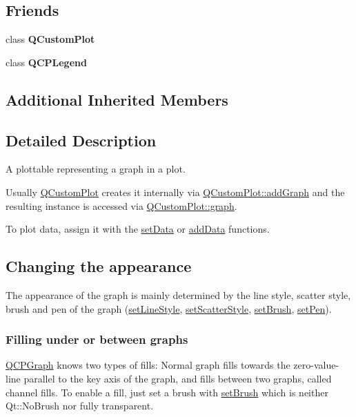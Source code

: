 \subsection*{Friends}
\begin{DoxyCompactItemize}
\item 
\hypertarget{classQCPGraph_a1cdf9df76adcfae45261690aa0ca2198}{class {\bfseries Q\-Custom\-Plot}}\label{classQCPGraph_a1cdf9df76adcfae45261690aa0ca2198}

\item 
\hypertarget{classQCPGraph_a8429035e7adfbd7f05805a6530ad5e3b}{class {\bfseries Q\-C\-P\-Legend}}\label{classQCPGraph_a8429035e7adfbd7f05805a6530ad5e3b}

\end{DoxyCompactItemize}
\subsection*{Additional Inherited Members}


\subsection{Detailed Description}
A plottable representing a graph in a plot. 

Usually \hyperlink{classQCustomPlot}{Q\-Custom\-Plot} creates it internally via \hyperlink{classQCustomPlot_a6fb2873d35a8a8089842d81a70a54167}{Q\-Custom\-Plot\-::add\-Graph} and the resulting instance is accessed via \hyperlink{classQCustomPlot_a6d3ed93c2bf46ab7fa670d66be4cddaf}{Q\-Custom\-Plot\-::graph}.

To plot data, assign it with the \hyperlink{classQCPGraph_a1df2fd710545c8ba3b2c99a39a27bf8b}{set\-Data} or \hyperlink{classQCPGraph_aa5c6181d84db72ce4dbe9dc15a34ef4f}{add\-Data} functions.\hypertarget{classQCPStatisticalBox_appearance}{}\subsection{Changing the appearance}\label{classQCPStatisticalBox_appearance}
The appearance of the graph is mainly determined by the line style, scatter style, brush and pen of the graph (\hyperlink{classQCPGraph_a513fecccff5b2a50ce53f665338c60ff}{set\-Line\-Style}, \hyperlink{classQCPGraph_a06373e09547bcfe237dd8ebcbe5c255a}{set\-Scatter\-Style}, \hyperlink{classQCPAbstractPlottable_a7a4b92144dca6453a1f0f210e27edc74}{set\-Brush}, \hyperlink{classQCPAbstractPlottable_ab74b09ae4c0e7e13142fe4b5bf46cac7}{set\-Pen}).\hypertarget{classQCPGraph_filling}{}\subsubsection{Filling under or between graphs}\label{classQCPGraph_filling}
\hyperlink{classQCPGraph}{Q\-C\-P\-Graph} knows two types of fills\-: Normal graph fills towards the zero-\/value-\/line parallel to the key axis of the graph, and fills between two graphs, called channel fills. To enable a fill, just set a brush with \hyperlink{classQCPAbstractPlottable_a7a4b92144dca6453a1f0f210e27edc74}{set\-Brush} which is neither Qt\-::\-No\-Brush nor fully transparent.

